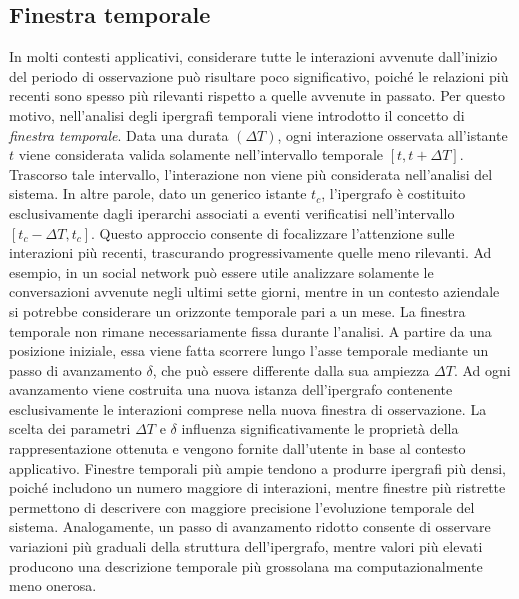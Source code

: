 \subsection{Finestra temporale}

In molti contesti applicativi, considerare tutte le interazioni avvenute dall'inizio del periodo di osservazione può risultare poco significativo, poiché le relazioni più recenti sono spesso più rilevanti rispetto a quelle avvenute in passato.
Per questo motivo, nell'analisi degli ipergrafi temporali viene introdotto il concetto di \textit{finestra temporale}.
Data una durata $(\Delta T)$, ogni interazione osservata all'istante $t$ viene considerata valida solamente nell'intervallo temporale $[t, t + \Delta T]$.
Trascorso tale intervallo, l'interazione non viene più considerata nell'analisi del sistema.
In altre parole, dato un generico istante $t_c$, l'ipergrafo è costituito esclusivamente dagli iperarchi associati a eventi verificatisi nell'intervallo $[t_c - \Delta T, t_c]$.
Questo approccio consente di focalizzare l'attenzione sulle interazioni più recenti, trascurando progressivamente quelle meno rilevanti.
Ad esempio, in un social network può essere utile analizzare solamente le conversazioni avvenute negli ultimi sette giorni, mentre in un contesto aziendale si potrebbe considerare un orizzonte temporale pari a un mese.
La finestra temporale non rimane necessariamente fissa durante l'analisi.
A partire da una posizione iniziale, essa viene fatta scorrere lungo l'asse temporale mediante un passo di avanzamento $\delta$, che può essere differente dalla sua ampiezza $\Delta T$. Ad ogni avanzamento viene costruita una nuova istanza dell'ipergrafo contenente esclusivamente le interazioni comprese nella nuova finestra di osservazione.
La scelta dei parametri $\Delta T$ e $\delta$ influenza significativamente le proprietà della rappresentazione ottenuta e vengono fornite dall'utente in base al contesto applicativo.
Finestre temporali più ampie tendono a produrre ipergrafi più densi, poiché includono un numero maggiore di interazioni, mentre finestre più ristrette permettono di descrivere con maggiore precisione l'evoluzione temporale del sistema.
Analogamente, un passo di avanzamento ridotto consente di osservare variazioni più graduali della struttura dell'ipergrafo, mentre valori più elevati producono una descrizione temporale più grossolana ma computazionalmente meno onerosa.

